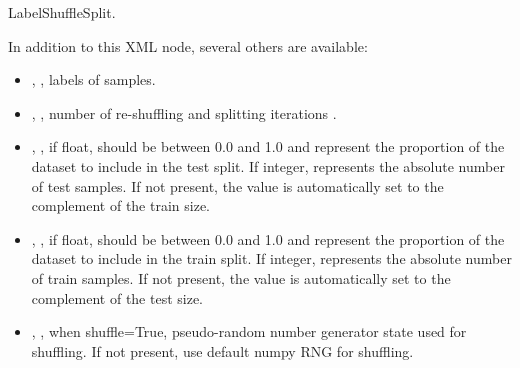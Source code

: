 LabelShuffleSplit.

In addition to this XML node, several others are available:
\begin{itemize}
  \item {}, , labels of samples.
  \item {}, , number of re-shuffling and splitting iterations
    .
  \item {}, , if float, should be between 0.0 and 1.0 and
    represent the proportion of the dataset to include in the test split. 
    If integer, represents the absolute number of test samples. If not present, the value is automatically set to
    the complement of the train size.
  \item {}, , if float, should be between 0.0 and 1.0 and represent
    the proportion of the dataset to include in the train split. If integer, represents the absolute number of train
    samples. If not present, the value is automatically set to the complement of the test size.
  \item {}, , when shuffle=True,
    pseudo-random number generator state used for shuffling. If not present, use default numpy RNG for shuffling.
\end{itemize}



